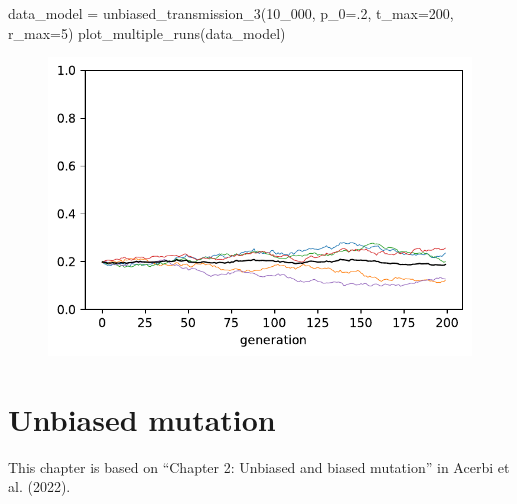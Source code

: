 \documentclass[
  a4paperpaper,
  ,captions=tableheading
]{scrbook}
\newenvironment{Shaded}{\begin{snugshade}}{\end{snugshade}}
\newcommand{\DecValTok}[1]{\textcolor[rgb]{0.68,0.00,0.00}{#1}}
\newcommand{\FloatTok}[1]{\textcolor[rgb]{0.68,0.00,0.00}{#1}}
\newcommand{\NormalTok}[1]{\textcolor[rgb]{0.00,0.23,0.31}{#1}}
\newcommand{\OperatorTok}[1]{\textcolor[rgb]{0.37,0.37,0.37}{#1}}
\begin{document}
\begin{Shaded}
\begin{Highlighting}[]
\NormalTok{data\_model }\OperatorTok{=}\NormalTok{ unbiased\_transmission\_3(}\DecValTok{10\_000}\NormalTok{, p\_0}\OperatorTok{=}\FloatTok{.2}\NormalTok{, t\_max}\OperatorTok{=}\DecValTok{200}\NormalTok{, r\_max}\OperatorTok{=}\DecValTok{5}\NormalTok{)}
\NormalTok{plot\_multiple\_runs(data\_model)}
\end{Highlighting}
\end{Shaded}

\begin{figure}[H]

{\centering \includegraphics{chapter03_files/figure-pdf/cell-29-output-1.pdf}

}

\end{figure}

\hypertarget{sec-unbiased_biased_mutation}{%
\chapter{Unbiased mutation}\label{sec-unbiased_biased_mutation}}

\begin{tcolorbox}[enhanced jigsaw, arc=.35mm, colbacktitle=quarto-callout-note-color!10!white, colback=white, breakable, toprule=.15mm, title=\textcolor{quarto-callout-note-color}{\faInfo}\hspace{0.5em}{Note}, left=2mm, bottomtitle=1mm, toptitle=1mm, leftrule=.75mm, opacitybacktitle=0.6, titlerule=0mm, opacityback=0, rightrule=.15mm, bottomrule=.15mm, coltitle=black, colframe=quarto-callout-note-color-frame]

This chapter is based on ``Chapter 2: Unbiased and biased mutation'' in
Acerbi et al. (2022).

\end{tcolorbox}
\end{document}

